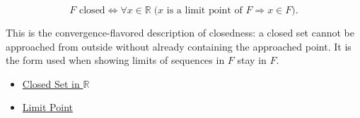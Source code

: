 \begin{remark*}
\[
F \text{ closed} \Longleftrightarrow \forall x\in\mathbb{R}\;\bigl(x \text{ is a limit point of } F \Rightarrow x\in F\bigr).
\]
\end{remark*}
\begin{remark*}[Interpretation]
This is the convergence-flavored description of closedness: a closed set cannot be approached from outside without already containing the approached point. It is the form used when showing limits of sequences in $F$ stay in $F$.
\end{remark*}
\begin{dependencies}
\begin{itemize}
  \item \hyperref[def:closed-set]{Closed Set in $\mathbb{R}$}
  \item \hyperref[def:limit-point]{Limit Point}
\end{itemize}
\end{dependencies}

